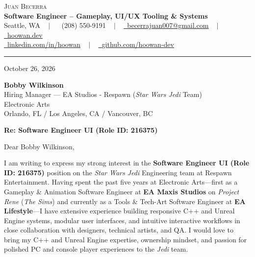 \documentclass[letterpaper,11pt]{article}
\begin{document}
\begin{center}
    {\Huge \scshape Juan Becerra} \\ \vspace{4pt}
    \textbf{\large Software Engineer -- Gameplay, UI/UX Tooling \& Systems} \\ \vspace{4pt}
    \small Seattle, WA ~ $|$ ~
    \raisebox{-0.1\height}\faPhone\ (208) 550-9191 ~ $|$ ~
    \href{mailto:becerrajuan007@gmail.com}{\raisebox{-0.2\height}\faEnvelope\ \underline{becerrajuan007@gmail.com}} ~ $|$ ~
    \href{https://hoowan.dev}{\raisebox{-0.2\height}\faGlobe\ \underline{hoowan.dev}} \\ \vspace{2pt}
    \href{https://linkedin.com/in/hoowan/}{\raisebox{-0.2\height}\faLinkedin\ \underline{linkedin.com/in/hoowan}} ~ $|$ ~
    \href{https://github.com/hoowan-dev}{\raisebox{-0.2\height}\faGithub\ \underline{github.com/hoowan-dev}}
\end{center}

\vspace{4pt}
\hrule
\vspace{14pt}

\noindent October 26, 2026

\vspace{8pt}
\noindent \textbf{Bobby Wilkinson} \\
Hiring Manager --- EA Studios - Respawn (\emph{Star Wars Jedi} Team) \\
Electronic Arts \\
Orlando, FL / Los Angeles, CA / Vancouver, BC

\vspace{8pt}
\noindent \textbf{Re: Software Engineer UI (Role ID: 216375)}

\vspace{8pt}
\noindent Dear Bobby Wilkinson,

I am writing to express my strong interest in the \textbf{Software Engineer UI (Role ID: 216375)} position on the \emph{Star Wars Jedi} Engineering team at Respawn Entertainment. Having spent the past five years at Electronic Arts---first as a Gameplay \& Animation Software Engineer at \textbf{EA Maxis Studios} on \emph{Project Rene} (\emph{The Sims}) and currently as a Tools \& Tech-Art Software Engineer at \textbf{EA Lifestyle}---I have extensive experience building responsive C++ and Unreal Engine systems, modular user interfaces, and intuitive interactive workflows in close collaboration with designers, technical artists, and QA. I would love to bring my C++ and Unreal Engine expertise, ownership mindset, and passion for polished PC and console player experiences to the \emph{Jedi} team.
\end{document}
